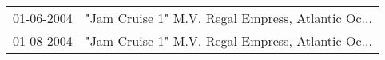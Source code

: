 \begin{supertabular}{ll}
 01-06-2004 &  "Jam Cruise 1" M.V. Regal Empress, Atlantic Oc... \\
 01-08-2004 &  "Jam Cruise 1" M.V. Regal Empress, Atlantic Oc... \\
\end{supertabular}
